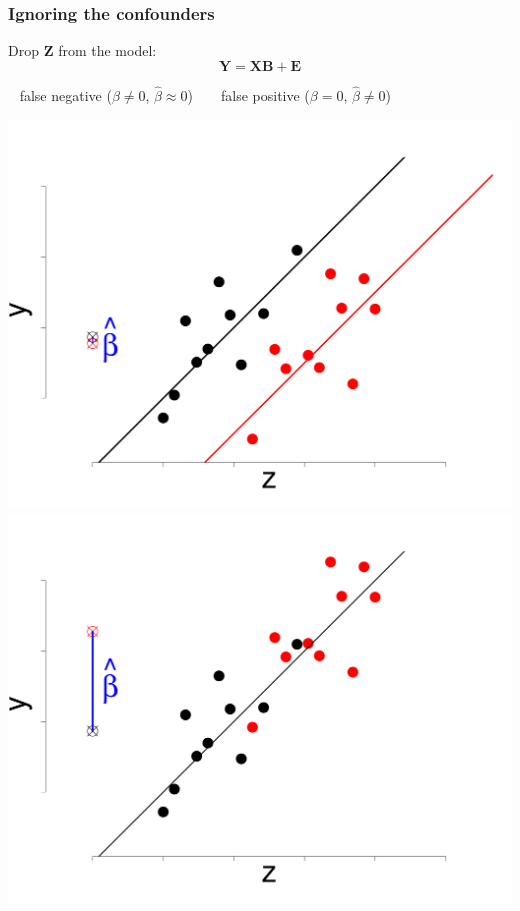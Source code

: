 \documentclass[xcolor={pdftex,dvipsnames,table}]{beamer}
\begin{document}
\begin{frame}
\frametitle{Ignoring the confounders}

Drop $\mathbf{Z}$ from the model:
\[
\mathbf{Y} =  \mathbf{X}\mathbf{B} + \mathbf{E}
\]

\bigskip

$\,\,\,$ false negative ($\beta\neq 0$, $\hat{\beta}\approx 0$) $\quad\,\,$ false positive ($\beta= 0$, $\hat{\beta} \neq 0$)

\includegraphics[scale=.2]{figures_perm_covariates/falsenegative}\includegraphics[scale=.2]{figures_perm_covariates/falsepositive}

\end{frame}
\end{document}
